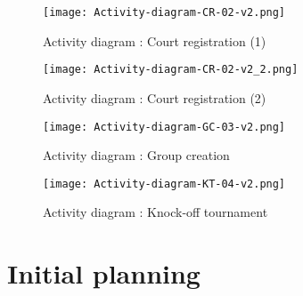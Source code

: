 \begin{figure}[!ht]
    \centering
    \texttt{[image: Activity-diagram-CR-02-v2.png]}
    \caption{Activity diagram : Court registration (1)}
    \texttt{[image: Activity-diagram-CR-02-v2\_2.png]}
    \caption{Activity diagram : Court registration (2)}
\end{figure}

\begin{figure}[!ht]
	\centering
     \texttt{[image: Activity-diagram-GC-03-v2.png]}
     \caption{Activity diagram : Group creation}
\end{figure}

\begin{figure}[!ht]
	\centering
    \texttt{[image: Activity-diagram-KT-04-v2.png]}
    \caption{Activity diagram : Knock-off tournament}
\end{figure}

\FloatBarrier

\section{Initial planning}


